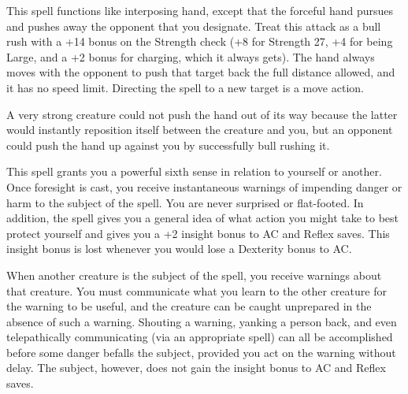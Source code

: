 \begin{multicols}{2}
\begin{small}
\noindent This spell functions like interposing hand, except that the forceful hand pursues and pushes away the opponent that you designate. Treat this attack as a bull rush with a +14 bonus on the Strength check (+8 for Strength 27, +4 for being Large, and a +2 bonus for charging, which it always gets). The hand always moves with the opponent to push that target back the full distance allowed, and it has no speed limit. Directing the spell to a new target is a move action.

\smallskip\noindent A very strong creature could not push the hand out of its way because the latter would instantly reposition itself between the creature and you, but an opponent could push the hand up against you by successfully bull rushing it.


\noindent This spell grants you a powerful sixth sense in relation to yourself or another. Once foresight is cast, you receive instantaneous warnings of impending danger or harm to the subject of the spell. You are never surprised or flat-footed. In addition, the spell gives you a general idea of what action you might take to best protect yourself and gives you a +2 insight bonus to AC and Reflex saves. This insight bonus is lost whenever you would lose a Dexterity bonus to AC.

\smallskip\noindent When another creature is the subject of the spell, you receive warnings about that creature. You must communicate what you learn to the other creature for the warning to be useful, and the creature can be caught unprepared in the absence of such a warning. Shouting a warning, yanking a person back, and even telepathically communicating (via an appropriate spell) can all be accomplished before some danger befalls the subject, provided you act on the warning without delay. The subject, however, does not gain the insight bonus to AC and Reflex saves.


\end{small}
\end{multicols}
